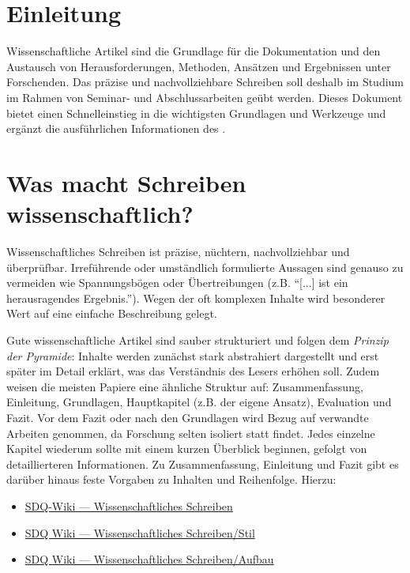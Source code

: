 \section{Einleitung}%
\label{sec:Einleitung}

Wissenschaftliche Artikel sind die Grundlage für die Dokumentation und den Austausch von Herausforderungen, Methoden, Ansätzen und Ergebnissen unter Forschenden.
Das präzise und nachvollziehbare Schreiben soll deshalb im Studium im Rahmen von Seminar- und Abschlussarbeiten geübt werden.
Dieses Dokument bietet einen Schnelleinstieg in die wichtigsten Grundlagen und Werkzeuge und ergänzt die ausführlichen Informationen des .


\section{Was macht Schreiben wissenschaftlich?}%
\label{sec:WissenschaftlichesSchreiben}

Wissenschaftliches Schreiben ist präzise, nüchtern, nachvollziehbar und überprüfbar.
Irreführende oder umständlich formulierte Aussagen sind genauso zu vermeiden wie Spannungsbögen oder Übertreibungen (z.B. \enquote{[...] ist ein herausragendes Ergebnis.}).
Wegen der oft komplexen Inhalte wird besonderer Wert auf eine einfache Beschreibung gelegt.

Gute wissenschaftliche Artikel sind sauber strukturiert und folgen dem \emph{Prinzip der Pyramide}:
Inhalte werden zunächst stark abstrahiert dargestellt und erst später im Detail erklärt, was das Verständnis des Lesers erhöhen soll.
Zudem weisen die meisten Papiere eine ähnliche Struktur auf: Zusammenfassung, Einleitung, Grundlagen, Hauptkapitel (z.B. der eigene Ansatz), Evaluation und Fazit.
Vor dem Fazit oder nach den Grundlagen wird Bezug auf verwandte Arbeiten genommen, da Forschung selten isoliert statt findet.
Jedes einzelne Kapitel wiederum sollte mit einem kurzen Überblick beginnen, gefolgt von detaillierteren Informationen.
Zu Zusammenfassung, Einleitung und Fazit gibt es darüber hinaus feste Vorgaben zu Inhalten und Reihenfolge.
Hierzu:

\smallskip
\begin{itemize}[label={\symbolInfo}]
    \item \href{https://sdqweb.ipd.kit.edu/wiki/Wissenschaftliches_Schreiben}{SDQ-Wiki --- Wissenschaftliches Schreiben }
    \item \href{https://sdqweb.ipd.kit.edu/wiki/Wissenschaftliches_Schreiben/Stil}{SDQ Wiki --- Wissenschaftliches Schreiben/Stil}
    \item \href{https://sdqweb.ipd.kit.edu/wiki/Wissenschaftliches_Schreiben/Aufbau}{SDQ Wiki --- Wissenschaftliches Schreiben/Aufbau}
\end{itemize}


